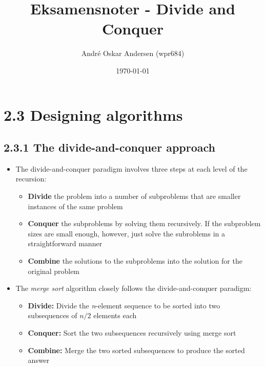 \documentclass{report}
\title{Eksamensnoter - Divide and Conquer}
\author{André Oskar Andersen (wpr684)}
\date{\today}
\begin{document}
\maketitle

\section*{2.3 Designing algorithms}
\subsection*{2.3.1 The divide-and-conquer approach}
\begin{itemize}
    \item The divide-and-conquer paradigm involves three steps at each level of the recursion:
    \begin{itemize}
        \item \textbf{Divide} the problem into a number of subproblems that are smaller instances of the same problem \\
        \item \textbf{Conquer} the subproblems by solving them recursively. If the subproblem sizes are small enough, however, just solve the subroblems in a straightforward manner \\
        \item \textbf{Combine} the solutions to the subproblems into the solution for the original problem
    \end{itemize}
    \item The \textit{merge sort} algorithm closely follows the divide-and-conquer paradigm:
    \begin{itemize}
        \item \textbf{Divide:} Divide the \textit{n}-element sequence to be sorted into two subsequences of $n/2$ elements each
        \item \textbf{Conquer:} Sort the two subsequences recursively using merge sort
        \item \textbf{Combine:} Merge the two sorted subsequences to produce the sorted answer
    \end{itemize}
\end{itemize}
\end{document}
